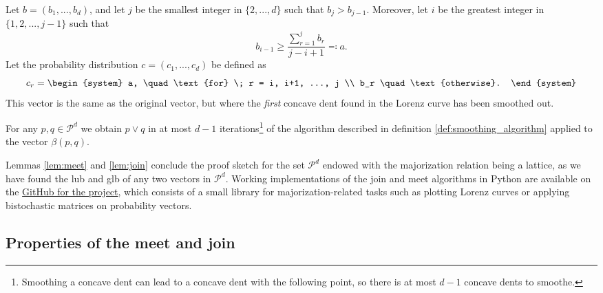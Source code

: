 \begin{definition} \label{def:smoothing_algorithm}
    Let $b = (b_1, ..., b_d)$, and let $j$ be the smallest integer in $\{2,...,d\}$ such that $b_j > b_{j-1}$. Moreover, let $i$ be the greatest integer in $\{1, 2, ..., j-1\}$ such that
    \begin{equation}
        b_{i-1} \geq \frac{\sum_{r=1}^{j}b_r}{j-i+1} \eqqcolon a.
    \end{equation}
    Let the probability distribution $c = (c_1, ..., c_d)$ be defined as
    \begin{equation}
        c_r = \begin{system}
                a, \quad \text{for} \; r = i, i+1, ..., j \\ %
                b_r \quad \text{otherwise}.
              \end{system}
    \end{equation}
    This vector is the same as the original vector, but where the \textit{first} concave dent found in the Lorenz curve has been smoothed out.
\end{definition}

\begin{lemma} \label{lem:join}
    For any $p, q \in \mathcal{P}^d$ we obtain $p \vee q$ in at most $d-1$ iterations\footnote{Smoothing a concave dent can lead to a concave dent with the following point, so there is at most $d-1$ concave dents to smoothe.} of the algorithm described in definition \ref{def:smoothing_algorithm} applied to the vector $\beta(p, q)$.
\end{lemma}

Lemmas \ref{lem:meet} and \ref{lem:join} conclude the proof sketch for the set $\mathcal{P}^d$ endowed with the majorization relation being a lattice, as we have found the lub and glb of any two vectors in $\mathcal{P}^d$. Working implementations of the join and meet algorithms in Python are available on the \href{https://github.com/traaldbjerg/MajoLat}{GitHub for the project}, which consists of a small library for majorization-related tasks such as plotting Lorenz curves or applying bistochastic matrices on probability vectors. 


 
\subsection{Properties of the meet and join}



